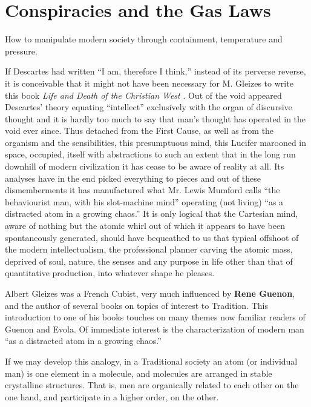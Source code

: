 \section{Conspiracies and the Gas Laws}

How to manipulate modern society through containment, temperature and pressure.

\begin{quotex}
If Descartes had written ``I am, therefore I think,'' instead of its perverse reverse, it is conceivable that it might not have been necessary for M. Gleizes to write this book \emph{Life and Death of the Christian West} . Out of the void appeared Descartes' theory equating ``intellect'' exclusively with the organ of discursive thought and it is hardly too much to say that man's thought has operated in the void ever since. Thus detached from the First Cause, as well as from the organism and the sensibilities, this presumptuous mind, this Lucifer marooned in space, occupied, itself with abstractions to such an extent that in the long run downhill of modern civilization it has cease to be aware of reality at all. Its analyses have in the end picked everything to pieces and out of these dismemberments it has manufactured what Mr. Lewis Mumford calls ``the behaviourist man, with his slot-machine mind'' operating (not living) ``as a distracted atom in a growing chaos.'' It is only logical that the Cartesian mind, aware of nothing but the atomic whirl out of which it appears to have been spontaneously generated, should have bequeathed to us that typical offshoot of the modern intellectualism, the professional planner carving the atomic mass, deprived of soul, nature, the senses and any purpose in life other than that of quantitative production, into whatever shape he pleases.
\end{quotex}

Albert Gleizes was a French Cubist, very much influenced by \textbf{Rene Guenon}, and the author of several books on topics of interest to Tradition. This introduction to one of his books touches on many themes now familiar readers of Guenon and Evola. Of immediate interest is the characterization of modern man ``as a distracted atom in a growing chaos.''

If we may develop this analogy, in a Traditional society an atom (or individual man) is one element in a molecule, and molecules are arranged in stable crystalline structures. That is, men are organically related to each other on the one hand, and participate in a higher order, on the other.

